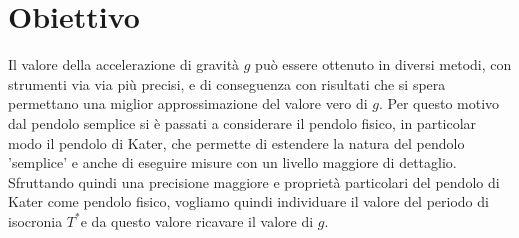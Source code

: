 \documentclass[italian, a4paper, 10pt, twocolumn]{../../style/lab_unige}
\newcommand{\Tiso}{$T^*$\space}
\begin{document}


    \section{Obiettivo}
    \label{section:aim}
    Il valore della accelerazione di gravità $g$ può essere ottenuto in diversi metodi, con strumenti via via 
    più precisi, e di conseguenza con risultati che si spera permettano una miglior approssimazione del valore 
    vero di $g$. Per questo motivo dal pendolo semplice si è passati a considerare il pendolo fisico, in particolar
    modo il pendolo di Kater, che permette di estendere la natura del pendolo 'semplice' e anche di eseguire misure 
    con un livello maggiore di dettaglio.\\
    Sfruttando quindi una precisione maggiore e proprietà particolari del pendolo di Kater come pendolo fisico,
    vogliamo quindi individuare il valore del periodo di isocronia \Tiso e da questo valore ricavare il valore di 
    $g$.
\end{document}
